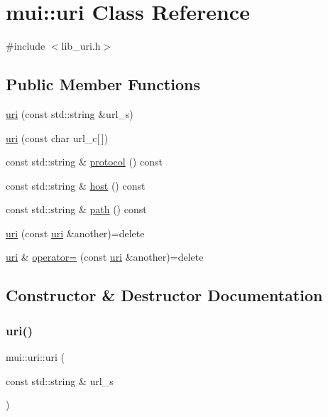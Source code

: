 \hypertarget{classmui_1_1uri}{}\section{mui\+:\+:uri Class Reference}
\label{classmui_1_1uri}


{\ttfamily \#include $<$lib\+\_\+uri.\+h$>$}

\subsection*{Public Member Functions}
\begin{DoxyCompactItemize}
\item 
\hyperlink{classmui_1_1uri_a8f2a295b5ceab273cacb4f9aeb014a6a}{uri} (const std\+::string \&url\+\_\+s)
\item 
\hyperlink{classmui_1_1uri_a6f19d39b0f85dfafdc63480473871d19}{uri} (const char url\+\_\+c\mbox{[}$\,$\mbox{]})
\item 
const std\+::string \& \hyperlink{classmui_1_1uri_a8f1e0f3bc7b709c25e39d90e9df8ae62}{protocol} () const
\item 
const std\+::string \& \hyperlink{classmui_1_1uri_aa1b6926eb9f5d4abcc7d2b874fa24210}{host} () const
\item 
const std\+::string \& \hyperlink{classmui_1_1uri_ab0525a812499d99a408c4706aac874ed}{path} () const
\item 
\hyperlink{classmui_1_1uri_a1f4ba35785bb99ac8d34fe61ba9e2408}{uri} (const \hyperlink{classmui_1_1uri}{uri} \&another)=delete
\item 
\hyperlink{classmui_1_1uri}{uri} \& \hyperlink{classmui_1_1uri_ad5365bd3b8040dc57eb9ad25930a46f6}{operator=} (const \hyperlink{classmui_1_1uri}{uri} \&another)=delete
\end{DoxyCompactItemize}


\subsection{Constructor \& Destructor Documentation}
\mbox{\label{classmui_1_1uri_a8f2a295b5ceab273cacb4f9aeb014a6a}} 
\subsubsection{\texorpdfstring{uri()}{uri()}\hspace{0.1cm}{\footnotesize\ttfamily [1/3]}}
{\footnotesize\ttfamily mui\+::uri\+::uri (\begin{DoxyParamCaption}\item[{const std\+::string \&}]{url\+\_\+s }\end{DoxyParamCaption})\hspace{0.3cm}{\ttfamily [inline]}}

